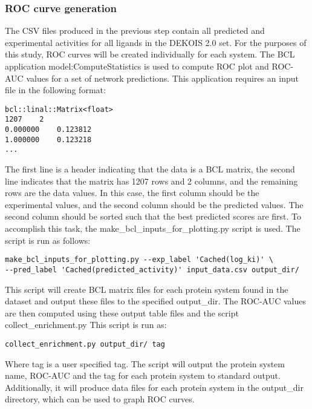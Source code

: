 \subsubsection{ROC curve generation}
The CSV files produced in the previous step contain all predicted and experimental activities for all ligands in the DEKOIS 2.0 set.
For the purposes of this study, ROC curves will be created individually for each system. 
The BCL application model:ComputeStatistics is used to compute ROC plot and ROC-AUC values for a set of network predictions.
This application requires an input file in the following format:
\singlespace
\begin{verbatim}
bcl::linal::Matrix<float>
1207	2
0.000000	0.123812
1.000000	0.123218
...
\end{verbatim}
\doublespace
The first line is a header indicating that the data is a BCL matrix, the second line indicates that the matrix has 1207 rows and 2 columns, and the remaining rows are the data values.
In this case, the first column should be the experimental values, and the second column should be the predicted values.
The second column should be sorted such that the best predicted scores are first.
To accomplish this task, the make\_bcl\_inputs\_for\_plotting.py script is used. 
The script is run as follows:
\singlespace
\begin{verbatim}
make_bcl_inputs_for_plotting.py --exp_label 'Cached(log_ki)' \
--pred_label 'Cached(predicted_activity)' input_data.csv output_dir/
\end{verbatim}
\doublespace
This script will create BCL matrix files for each protein system found in the dataset and output these files to the specified output\_dir.
The ROC-AUC values are then computed using these output table files and the script collect\_enrichment.py
This script is run as:
\singlespace
\begin{verbatim}
collect_enrichment.py output_dir/ tag
\end{verbatim}
\doublespace
Where tag is a user specified tag.
The script will output the protein system name, ROC-AUC and the tag for each protein system to standard output.
Additionally, it will produce data files for each protein system in the output\_dir directory, which can be used to graph ROC curves. 
